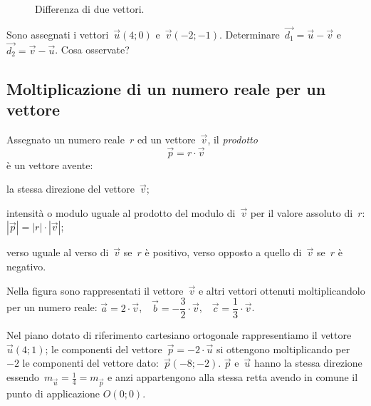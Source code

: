 \begin{figure}[htb]
 \centering
 
 \caption{Differenza di due vettori.}
 \label{fig:F.11}
\end{figure}

\begin{exrig}
\begin{esempio}

Sono assegnati i vettori~$\vec{u}(4;0)$ e~$\vec{v}(-2;-1)$. Determinare~$\vec{d_1}=\vec{u}-\vec{v}$ e~$\vec{d_2}=\vec{v}-\vec{u}$. Cosa osservate?
\begin{center}
 
\end{center}
\end{esempio}
\end{exrig}

\subsection{Moltiplicazione di un numero reale per un vettore}

\begin{definizione}
Assegnato un numero reale~$r$ ed un vettore~$\vec{v}$, il \emph{prodotto}
\[\vec{p} = r \cdot \vec{v}\]
è un vettore avente:
\begin{enumeratea}
\item la stessa direzione del vettore~$\vec{v}$;
\item intensità o modulo uguale al prodotto del modulo di~$\vec{v}$ per il valore assoluto di~$r$:
 \subitem $|\vec{p}|=|r| \cdot|\vec{v}|$;
\item verso uguale al verso di~$\vec{v}$ se~$r$ è positivo, verso opposto a quello di~$\vec{v}$ se~$r$ è negativo.
\end{enumeratea}
\end{definizione}

\begin{exrig}
\begin{esempio}
Nella figura sono rappresentati il vettore~$\vec{v}$ e altri vettori ottenuti moltiplicandolo per un numero reale:
$\vec{a}=2 \cdot \vec{v}$,~~$\vec{b}=-\dfrac{3}{2} \cdot \vec{v}$,~~$\vec{c}=\dfrac{1}{3} \cdot \vec{v}$.
\begin{center}
 
\end{center}

\end{esempio}
\begin{esempio}
Nel piano dotato di riferimento cartesiano ortogonale rappresentiamo il vettore~$\vec{u}(4;1)$; le componenti
del vettore~$\vec{p}=-2\cdot \vec{u}$ si ottengono moltiplicando per~$-2$ le componenti del vettore dato:~$\vec{p}(-8;-2)$. $\vec{p}$ e~$\vec{u}$
hanno la stessa direzione essendo~$m_{\vec{u}}=\frac{1}{4}=m_{\vec{p}}$ e anzi appartengono alla stessa retta avendo in comune il punto di applicazione $O(0;0)$.
\begin{center}
 
\end{center}
\end{esempio}
\end{exrig}

